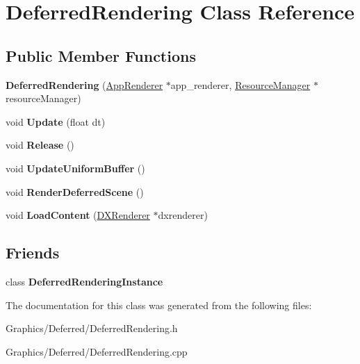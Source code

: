 \hypertarget{classDeferredRendering}{}\section{Deferred\+Rendering Class Reference}
\label{classDeferredRendering}
\subsection*{Public Member Functions}
\begin{DoxyCompactItemize}
\item 
\mbox{\label{classDeferredRendering_ab4a24dc0c49a14bb7a3596c9462d93a0}} 
{\bfseries Deferred\+Rendering} (\hyperlink{classAppRenderer}{App\+Renderer} $\ast$app\+\_\+renderer, \hyperlink{classResourceManager}{Resource\+Manager} $\ast$resource\+Manager)
\item 
\mbox{\label{classDeferredRendering_a5a05961f939d07ef4cb5daba249a6ae4}} 
void {\bfseries Update} (float dt)
\item 
\mbox{\label{classDeferredRendering_af9af71f517c1d1a698d2ea5da4612e0a}} 
void {\bfseries Release} ()
\item 
\mbox{\label{classDeferredRendering_a27bff08989adc1825e418400e4d62ba9}} 
void {\bfseries Update\+Uniform\+Buffer} ()
\item 
\mbox{\label{classDeferredRendering_a88d3861ae2d0eb9ee5abf5766e3b79ac}} 
void {\bfseries Render\+Deferred\+Scene} ()
\item 
\mbox{\label{classDeferredRendering_a34ab245657e86def038a054937ab5420}} 
void {\bfseries Load\+Content} (\hyperlink{classDXRenderer}{D\+X\+Renderer} $\ast$dxrenderer)
\end{DoxyCompactItemize}
\subsection*{Friends}
\begin{DoxyCompactItemize}
\item 
\mbox{\label{classDeferredRendering_a7bec99218ac38952a4baa8888bc7fedc}} 
class {\bfseries Deferred\+Rendering\+Instance}
\end{DoxyCompactItemize}


The documentation for this class was generated from the following files\+:\begin{DoxyCompactItemize}
\item 
Graphics/\+Deferred/Deferred\+Rendering.\+h\item 
Graphics/\+Deferred/Deferred\+Rendering.\+cpp\end{DoxyCompactItemize}
